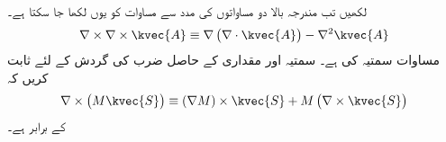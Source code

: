 لکھیں تب مندرجہ بالا دو مساواتوں کی مدد سے مساوات  کو یوں لکھا جا سکتا ہے۔
\begin{align}\label{مساوات_مقناطیسی_گردش_کی_گردش_ب}
\nabla \times \nabla \times \kvec{A} \equiv \nabla \left(\nabla \cdot \kvec{A} \right)-\nabla^2 \kvec{A}
\end{align}
مساوات  سمتیہ کی  ہے۔
سمتیہ  اور مقداری  کے حاصل ضرب کی گردش کے لئے ثابت کریں کہ
\begin{align}
\nabla \times \left(M\kvec{S}\right) \equiv \left(\nabla M\right) \times \kvec{S}+M \left(\nabla \times \kvec{S}\right)
\end{align}
کے برابر ہے۔

